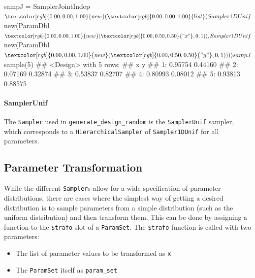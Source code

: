 \documentclass[12pt,]{scrbook}
\newenvironment{Shaded}{}{}
\newcommand{\DecValTok}[1]{#1}
\newcommand{\KeywordTok}[1]{\textcolor[rgb]{0.00,0.00,1.00}{#1}}
\newcommand{\NormalTok}[1]{#1}
\newcommand{\OperatorTok}[1]{#1}
\newcommand{\StringTok}[1]{\textcolor[rgb]{0.00,0.50,0.50}{#1}}
\providecommand{\tightlist}{%
  \setlength{\itemsep}{0pt}\setlength{\parskip}{0pt}}
\let\oldparagraph\paragraph
\renewcommand{\paragraph}[1]{\oldparagraph{#1}\mbox{}}
\begin{document}
\begin{Shaded}
\begin{Highlighting}[]
\NormalTok{sampJ =}\StringTok{ }\NormalTok{SamplerJointIndep}\OperatorTok{$}\KeywordTok{new}\NormalTok{(}\KeywordTok{list}\NormalTok{(Sampler1DUnif}\OperatorTok{$}\KeywordTok{new}\NormalTok{(ParamDbl}\OperatorTok{$}\KeywordTok{new}\NormalTok{(}\StringTok{"x"}\NormalTok{, }
  \DecValTok{0}\NormalTok{, }\DecValTok{1}\NormalTok{)), Sampler1DUnif}\OperatorTok{$}\KeywordTok{new}\NormalTok{(ParamDbl}\OperatorTok{$}\KeywordTok{new}\NormalTok{(}\StringTok{"y"}\NormalTok{, }\DecValTok{0}\NormalTok{, }\DecValTok{1}\NormalTok{))))}
\NormalTok{sampJ}\OperatorTok{$}\KeywordTok{sample}\NormalTok{(}\DecValTok{5}\NormalTok{)}
\NormalTok{## <Design> with 5 rows:}
\NormalTok{##          x       y}
\NormalTok{## 1: 0.95754 0.44160}
\NormalTok{## 2: 0.07169 0.32874}
\NormalTok{## 3: 0.53837 0.82707}
\NormalTok{## 4: 0.80993 0.08012}
\NormalTok{## 5: 0.93813 0.88575}
\end{Highlighting}
\end{Shaded}

\hypertarget{samplerunif}{%
\paragraph{SamplerUnif}\label{samplerunif}}

The \texttt{Sampler} used in \texttt{generate\_design\_random} is the \texttt{SamplerUnif} sampler, which corresponds to a \texttt{HierarchicalSampler} of \texttt{Sampler1DUnif} for all parameters.

\hypertarget{parameter-transformation}{%
\subsection{Parameter Transformation}\label{parameter-transformation}}

While the different \texttt{Sampler}s allow for a wide specification of parameter distributions, there are cases where the simplest way of getting a desired distribution is to sample parameters from a simple distribution (such as the uniform distribution) and then transform them.
This can be done by assigning a function to the \texttt{\$trafo} slot of a \texttt{ParamSet}.
The \texttt{\$trafo} function is called with two parameters:

\begin{itemize}
\tightlist
\item
  The list of parameter values to be transformed as \texttt{x}
\item
  The \texttt{ParamSet} itself as \texttt{param\_set}
\end{itemize}
\end{document}
